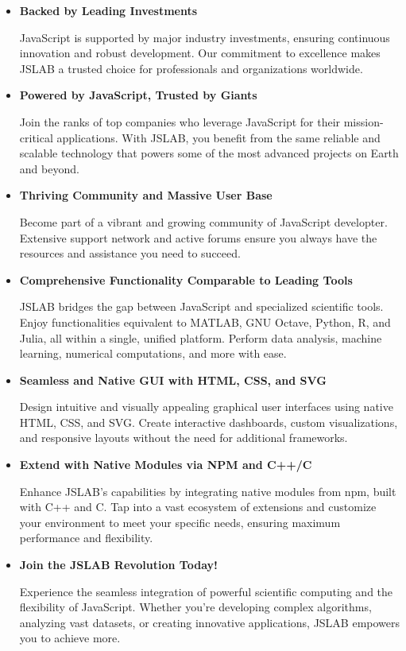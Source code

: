\documentclass[12pt,a4paper]{article}
\begin{document}
\begin{itemize}
    \item \textbf{Backed by Leading Investments}

JavaScript is supported by major industry investments, ensuring continuous innovation and robust development. Our commitment to excellence makes JSLAB a trusted choice for professionals and organizations worldwide.

\item \textbf{Powered by JavaScript, Trusted by Giants}

Join the ranks of top companies who leverage JavaScript for their mission-critical applications. With JSLAB, you benefit from the same reliable and scalable technology that powers some of the most advanced projects on Earth and beyond.

\item \textbf{Thriving Community and Massive User Base}

Become part of a vibrant and growing community of JavaScript developter. Extensive support network and active forums ensure you always have the resources and assistance you need to succeed.

\item \textbf{Comprehensive Functionality Comparable to Leading Tools}

JSLAB bridges the gap between JavaScript and specialized scientific tools. Enjoy functionalities equivalent to MATLAB, GNU Octave, Python, R, and Julia, all within a single, unified platform. Perform data analysis, machine learning, numerical computations, and more with ease.

\item \textbf{Seamless and Native GUI with HTML, CSS, and SVG}

Design intuitive and visually appealing graphical user interfaces using native HTML, CSS, and SVG. Create interactive dashboards, custom visualizations, and responsive layouts without the need for additional frameworks.

\item \textbf{Extend with Native Modules via NPM and C++/C}

Enhance JSLAB’s capabilities by integrating native modules from npm, built with C++ and C. Tap into a vast ecosystem of extensions and customize your environment to meet your specific needs, ensuring maximum performance and flexibility.

\item \textbf{Join the JSLAB Revolution Today!}

Experience the seamless integration of powerful scientific computing and the flexibility of JavaScript. Whether you're developing complex algorithms, analyzing vast datasets, or creating innovative applications, JSLAB empowers you to achieve more.

\end{itemize}
\end{document}
